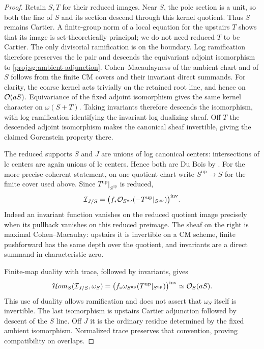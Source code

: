 \begin{proof}
Retain $S,T$ for their reduced images.  Near $S$, the pole
section is a unit, so both the line of $S$ and its section
descend through this kernel quotient.  Thus $S$ remains
Cartier.  A finite-group norm of a local equation for the
upstairs $T$ shows that its image is set-theoretically
principal; we do not need reduced $T$ to be Cartier.
The only divisorial ramification is on the boundary.
Log ramification therefore preserves the lc pair and descends
the equivariant adjoint isomorphism to
\eqref{proj:sg:ambient-adjunction}.  Cohen--Macaulayness of the
ambient chart and of $S$ follows from the finite CM covers
and their invariant direct summands.  For clarity, the
coarse kernel acts trivially on the retained root line,
and hence on $\mathcal{O}(aS)$.  Equivariance of the fixed adjoint
isomorphism gives the same kernel character on
$\omega(S+T)$.  Taking invariants therefore descends the
isomorphism, with log ramification identifying the
invariant log dualizing sheaf.  Off $T$ the descended
adjoint isomorphism makes the canonical sheaf invertible,
giving the claimed Gorenstein property there.

The reduced supports $S$ and $J$ are unions of log canonical
centers: intersections of lc centers are again unions of
lc centers.  Hence both are Du Bois by
\cite[Theorems~1.4 and~1.7]{Proj-KollarKovacs2010}.
For the more precise coherent statement, on one quotient
chart write $S^{\mathrm{up}}\to S$ for the finite cover used
above.  Since $T^{\mathrm{up}}|_{S^{\mathrm{up}}}$ is reduced,
\[
 \mathcal I_{J/S}
 =
 \bigl(f_*\mathcal{O}_{S^{\mathrm{up}}}
       (-T^{\mathrm{up}}|_{S^{\mathrm{up}}})\bigr)^{\mathrm{inv}}.
\]
Indeed an invariant function vanishes on the reduced quotient
image precisely when its pullback vanishes on this reduced
preimage.  The sheaf on the right is maximal Cohen--Macaulay:
upstairs it is invertible on a CM scheme, finite pushforward
has the same depth over the quotient, and invariants are a
direct summand in characteristic zero.

Finite-map duality with trace, followed by invariants, gives
\[
 \mathcal Hom_S(\mathcal I_{J/S},\omega_S)
 =
 \bigl(f_*\omega_{S^{\mathrm{up}}}
       (T^{\mathrm{up}}|_{S^{\mathrm{up}}})\bigr)^{\mathrm{inv}}
 \simeq\mathcal{O}_S(aS).
\]
This use of duality allows ramification and does not assert
that $\omega_S$ itself is invertible.  The last isomorphism
is upstairs Cartier adjunction followed by descent of the
$S$ line.  Off $J$ it is the ordinary residue determined by
the fixed ambient isomorphism.  Normalized trace preserves
that convention, proving compatibility on overlaps.


\end{proof}

